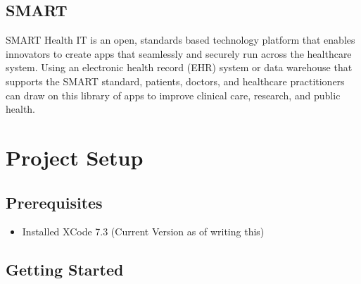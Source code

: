 \documentclass{article}
\begin{document}
\subsection{SMART}
SMART Health IT is an open, standards based technology platform that enables innovators to create apps that seamlessly and securely run across the healthcare system. Using an electronic health record (EHR) system or data warehouse that supports the SMART standard, patients, doctors, and healthcare practitioners can draw on this library of apps to improve clinical care, research, and public health. \cite{smart}

\section{Project Setup}\label{step1}

\subsection{Prerequisites}\label{step1:prerequisites}

\begin{itemize}

\item
  Installed XCode 7.3 (Current Version as of writing this)
\end{itemize}

\subsection{Getting Started}\label{step1:getting-started}
\end{document}
